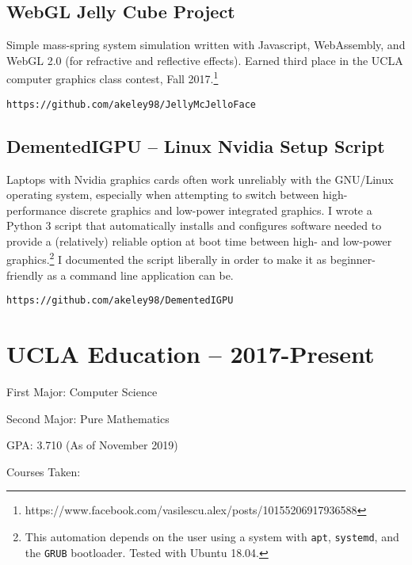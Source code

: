 \documentclass[11pt]{article}
\begin{document}
\subsection{WebGL Jelly Cube Project}

Simple mass-spring system simulation written with Javascript,
WebAssembly, and WebGL 2.0 (for refractive and reflective effects).
Earned third place in the UCLA computer graphics class contest, Fall
2017.\footnote{
  https://www.facebook.com/vasilescu.alex/posts/10155206917936588}

\texttt{https://github.com/akeley98/JellyMcJelloFace}

\subsection{DementedIGPU -- Linux Nvidia Setup Script}

Laptops with Nvidia graphics cards often work unreliably with the
GNU/Linux operating system, especially when attempting to switch
between high-performance discrete graphics and low-power integrated
graphics. I wrote a Python 3 script that automatically installs and
configures software needed to provide a (relatively) reliable option
at boot time between high- and low-power graphics.\footnote{This
  automation depends on the user using a system with \texttt{apt},
  \texttt{systemd}, and the \texttt{GRUB} bootloader. Tested with
  Ubuntu 18.04.} I documented the script liberally in order to make it
as beginner-friendly as a command line application can be.

\texttt{https://github.com/akeley98/DementedIGPU}

\section{UCLA Education -- 2017-Present}

First Major: Computer Science

Second Major: Pure Mathematics

GPA: 3.710 (As of November 2019)

Courses Taken:
\end{document}
